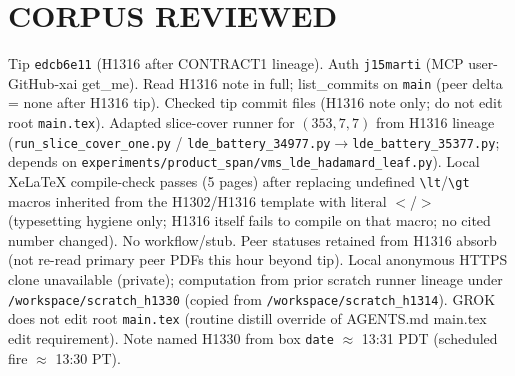 \documentclass[11pt]{article}
\begin{document}
\section*{CORPUS REVIEWED}
Tip \texttt{edcb6e11} (H1316 after CONTRACT1 lineage). Auth \texttt{j15marti} (MCP user-GitHub-xai get\_me).
Read H1316 note in full; list\_commits on \texttt{main} (peer delta = none after H1316 tip).
Checked tip commit files (H1316 note only; do not edit root \texttt{main.tex}).
Adapted slice-cover runner for $(353,7,7)$ from H1316 lineage
(\texttt{run\_slice\_cover\_one.py} / \texttt{lde\_battery\_34977.py}$\to$\texttt{lde\_battery\_35377.py};
depends on \texttt{experiments/product\_span/vms\_lde\_hadamard\_leaf.py}).
Local XeLaTeX compile-check passes (5 pages) after replacing undefined \texttt{\textbackslash lt}/\texttt{\textbackslash gt}
macros inherited from the H1302/H1316 template with literal $<$/$>$ (typesetting hygiene only; H1316 itself fails to compile on that macro; no cited number changed).
No workflow/stub. Peer statuses retained from H1316 absorb (not re-read primary peer PDFs this hour beyond tip).
Local anonymous HTTPS clone unavailable (private);
computation from prior scratch runner lineage under \texttt{/workspace/scratch\_h1330}
(copied from \texttt{/workspace/scratch\_h1314}).
GROK does not edit root \texttt{main.tex} (routine distill override of AGENTS.md main.tex edit requirement).
Note named H1330 from box \texttt{date} $\approx$ 13:31 PDT (scheduled fire $\approx$ 13:30 PT).
\end{document}
